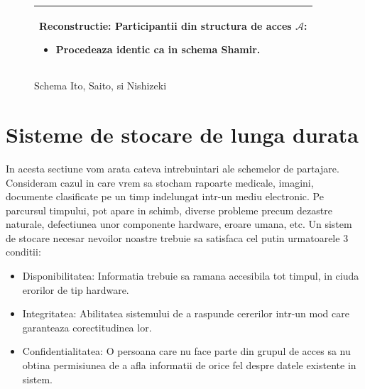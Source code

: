 \documentclass{llncs}
\begin{document}
\begin{figure}[h!]
\begin{tabular}{|p{\textwidth}|}
\hspace{.1in}
\textbf{Reconstructie}: Participantii din structura de acces $\mathcal{A}$:
	\begin{itemize}
		\item Procedeaza identic ca in schema Shamir.
	\end{itemize}


\\
\hline
\end{tabular}

\caption{Schema Ito, Saito, si Nishizeki \cite{ITO:1989}}
\label{fig:ito_et_al}
\end{figure}





\section{Sisteme de stocare de lunga durata}

In acesta sectiune vom arata cateva intrebuintari ale schemelor de partajare. Consideram cazul in care vrem sa stocham rapoarte medicale, imagini, documente clasificate pe un timp indelungat intr-un mediu electronic. Pe parcursul timpului, pot apare in schimb, diverse probleme precum dezastre naturale, defectiunea unor componente hardware, eroare umana, etc. \cite{SGMV:2009}
Un sistem de stocare necesar nevoilor noastre trebuie sa satisfaca cel putin urmatoarele 3 conditii:
\begin{itemize}
	\item Disponibilitatea: Informatia trebuie sa ramana accesibila tot timpul, in ciuda erorilor de tip hardware.
	\item Integritatea: Abilitatea sistemului de a raspunde cererilor intr-un mod care garanteaza corectitudinea lor.
	\item Confidentialitatea: O persoana care nu face parte din grupul de acces sa nu obtina permisiunea de a afla informatii de orice fel despre datele existente in sistem.
\end{itemize}
\end{document}
